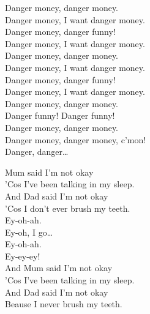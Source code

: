 
\label{ep:willoughbys-beach}




Danger money, danger money. \\
Danger money, I want danger money. \\
Danger money, danger funny! \\
Danger money, I want danger money. \\

Danger money, danger money. \\
Danger money, I want danger money. \\
Danger money, danger funny! \\
Danger money, I want danger money. \\

Danger money, danger money. \\
Danger funny! Danger funny! \\
Danger money, danger money. \\
Danger money, danger money, c'mon! \\

Danger, danger… \\




Mum said I'm not okay \\
'Cos I've been talking in my sleep. \\
And Dad said I'm not okay \\
'Cos I don't ever brush my teeth. \\

Ey-oh-ah. \\
Ey-oh, I go… \\

Ey-oh-ah. \\
Ey-ey-ey! \\

And Mum said I'm not okay \\
'Cos I've been talking in my sleep. \\
And Dad said I'm not okay \\
Beause I never brush my teeth. \\

